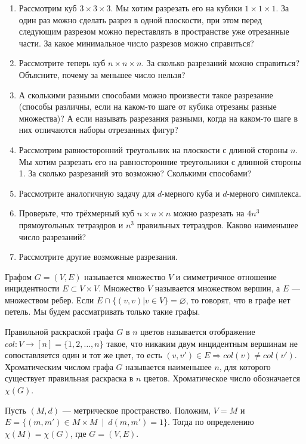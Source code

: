 \begin{enumerate}
\item Рассмотрим куб $3\times 3\times 3$. Мы хотим разрезать его на кубики $1\times 1\times 1$. За один раз можно сделать разрез в одной плоскости, при этом перед следующим разрезом можно переставлять в пространстве уже отрезанные части. За какое минимальное число разрезов можно справиться?
\item Рассмотрите теперь куб $n\times n\times n$. За сколько разрезаний можно справиться? Объясните, почему за меньшее число нельзя?
\item А сколькими разными способами можно произвести такое разрезание (способы различны, если на каком-то шаге от кубика отрезаны разные множества)? А если называть разрезания разными, когда на каком-то шаге в них отличаются наборы отрезанных фигур?
\item Рассмотрим равносторонний треугольник на плоскости с длиной стороны $n$. Мы хотим разрезать его на равносторонние треугольники с длинной стороны 1. За сколько разрезаний это возможно? Сколькими способами?
\item Рассмотрите аналогичную задачу для $d$-мерного куба и $d$-мерного симплекса.
\item Проверьте, что трёхмерный куб $n\times n \times n$ можно разрезать на $4n^3$ прямоугольных тетраэдров и $n^3$ правильных тетраэдров. Каково наименьшее число разрезаний?
\item Рассмотрите другие возможные разрезания. 
\end{enumerate}



 Графом $G = (V,E)$ называется множество $V$ и симметричное отношение инцидентности $E\subset V\times V$. Множество $V$ называется множеством вершин, а $E$ --- множеством ребер. Если $E\cap \{(v,v)|v\in V\} = \varnothing$, то говорят, что в графе нет петель. Мы будем рассматривать только такие графы.

Правильной раскраской графа $G$ в $n$ цветов называется отображение $col: V\to [n] = \{1,2,\dots, n\}$ такое, что никаким двум инцидентным вершинам не сопоставляется один и тот же цвет, то есть $(v,v')\in E \Rightarrow col(v)\neq col(v')$. Хроматическим числом графа $G$ называется наименьшее $n$, для которого существует правильная раскраска в $n$ цветов. Хроматическое число обозначается $\chi(G)$.

Пусть $(M,d)$ --- метрическое пространство. Положим, $V = M$ и $E = \{(m,m')\in M\times M\ \mid\ d(m,m') = 1\}$. Тогда по определению $\chi(M) = \chi(G)$, где $G = (V,E)$.

